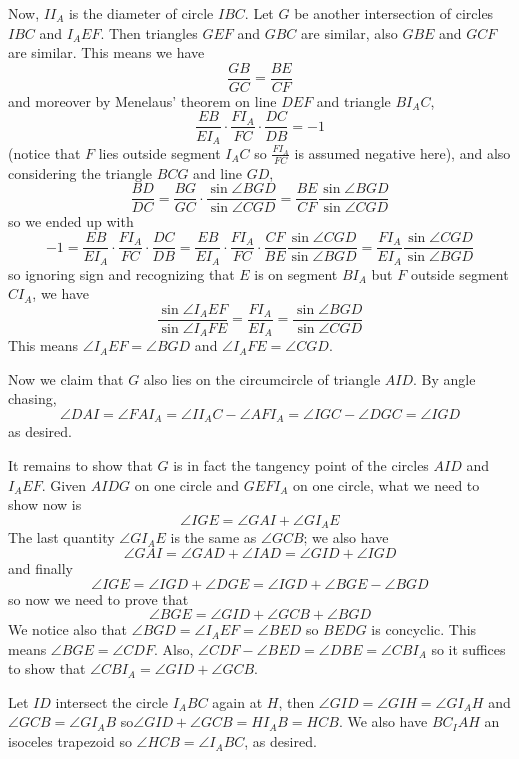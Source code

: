 \documentclass[11pt,a4paper]{article}
\begin{document}
\begin{enumerate}
	Now, $II_A$ is the diameter of circle $IBC$. Let $G$ be another intersection of circles $IBC$ and $I_AEF$. 
	Then triangles $GEF$ and $GBC$ are similar, also $GBE$ and $GCF$ are similar. 
	This means we have 
	\[
	\frac{GB}{GC}=\frac{BE}{CF}
	\]
	and moreover by Menelaus' theorem on line $DEF$ and triangle $BI_AC$, 
	\[
	\frac{EB}{EI_A}\cdot \frac{FI_A}{FC}\cdot \frac{DC}{DB}=-1
	\]
	(notice that $F$ lies outside segment $I_AC$ so $\frac{FI_A}{FC}$ is assumed negative here), 
	and also considering the triangle $BCG$ and line $GD$, 
	\[
	\frac{BD}{DC} = \frac{BG}{GC}\cdot \frac{\sin\angle BGD}{\sin\angle CGD}
	=\frac{BE}{CF}\frac{\sin\angle BGD}{\sin\angle CGD}
	\]
	so we ended up with 
	\[
	-1=\frac{EB}{EI_A}\cdot \frac{FI_A}{FC}\cdot \frac{DC}{DB}
	=\frac{EB}{EI_A}\cdot \frac{FI_A}{FC}\cdot \frac{CF}{BE}\frac{\sin\angle CGD}{\sin\angle BGD}
	=\frac{FI_A}{EI_A}\frac{\sin\angle CGD}{\sin\angle BGD}
	\]
	so ignoring sign and recognizing that $E$ is on segment $BI_A$ but $F$ outside segment $CI_A$, we have 
	\[
	\frac{\sin\angle I_AEF}{\sin\angle I_AFE}=\frac{FI_A}{EI_A} = \frac{\sin\angle BGD}{\sin\angle CGD}
	\]
	This means $\angle I_AEF = \angle BGD$ and $\angle I_AFE=\angle CGD$. 
	
	Now we claim that $G$ also lies on the circumcircle of triangle $AID$. By angle chasing, 
	\[
	\angle DAI
	=\angle FAI_A 
	=\angle II_AC - \angle AFI_A
	=\angle IGC - \angle DGC
	=\angle IGD
	\]
	as desired. 
	
	It remains to show that $G$ is in fact the tangency point of the circles $AID$ and $I_AEF$. Given $AIDG$ on one circle and $GEFI_A$ on one circle, what we need to show now is 
	\[
	\angle IGE = \angle GAI + \angle GI_AE
	\]
	The last quantity $\angle GI_AE$ is the same as $\angle GCB$; we also have 
	\[
	\angle GAI = \angle GAD+\angle IAD = \angle GID+\angle IGD 
	\]
	and finally 
	\[
	\angle IGE=\angle IGD+\angle DGE = \angle IGD+\angle BGE-\angle BGD 
	\]
	so now we need to prove that 
	\[
	\angle BGE=\angle GID + \angle GCB + \angle BGD
	\]
	We notice also that $\angle BGD=\angle I_AEF = \angle BED$ so $BEDG$ is concyclic. This means $\angle BGE=\angle CDF$. 
	Also, $\angle CDF-\angle BED=\angle DBE=\angle CBI_A$ so it suffices to show that $\angle CBI_A=\angle GID+\angle GCB$. 
	
	Let $ID$ intersect the circle $I_ABC$ again at $H$, then $\angle GID=\angle GIH=\angle GI_AH$ and $\angle GCB=\angle GI_AB$ so$\angle GID+\angle GCB=HI_AB=HCB$. We also have $BC_IAH$ an isoceles trapezoid so $\angle HCB=\angle I_ABC$, as desired. 
	

\end{enumerate}
\end{document}

